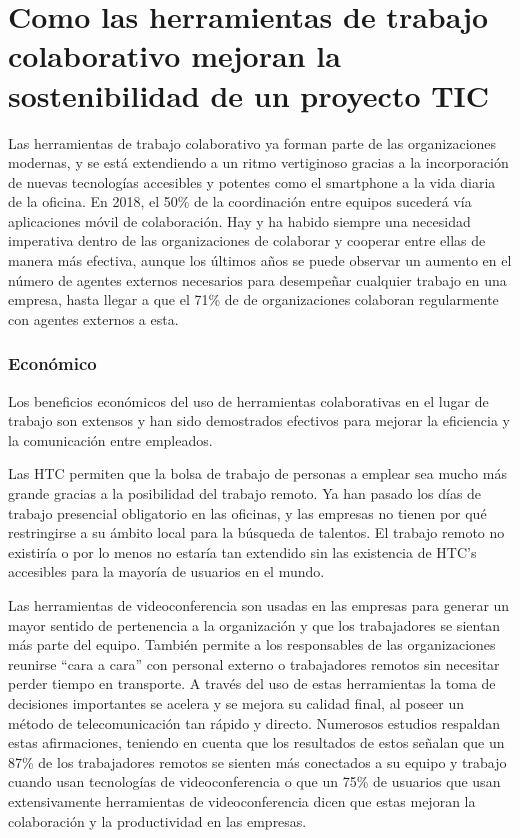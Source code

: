 \section{Como las herramientas de trabajo colaborativo mejoran la sostenibilidad de un proyecto TIC}

Las herramientas de trabajo colaborativo ya forman parte de las organizaciones modernas, y se está extendiendo a un ritmo vertiginoso gracias a la incorporación de nuevas tecnologías accesibles y potentes como el smartphone a la vida diaria de la oficina. En 2018, el 50\%\cite{adam} de la coordinación entre equipos sucederá vía aplicaciones móvil de colaboración. Hay y ha habido siempre una necesidad imperativa dentro de las organizaciones de colaborar y cooperar entre ellas de manera más efectiva, aunque los últimos años se puede observar un aumento en el número de agentes externos necesarios para desempeñar cualquier trabajo en una empresa, hasta llegar a que el 71\%\cite{ceb} de de organizaciones colaboran regularmente con agentes externos a esta.

\subsubsection{Económico}

Los beneficios económicos del uso de herramientas colaborativas en el lugar de trabajo son extensos y han sido demostrados efectivos para mejorar la eficiencia y la comunicación entre empleados.

Las HTC permiten que la bolsa de trabajo de personas a emplear sea mucho más grande gracias a la posibilidad del trabajo remoto. Ya han pasado los días de trabajo presencial obligatorio en las oficinas, y las empresas no tienen por qué restringirse a su ámbito local para la búsqueda de talentos. El trabajo remoto no existiría o por lo menos no estaría tan extendido sin las existencia de HTC’s accesibles para la mayoría de usuarios en el mundo.

Las herramientas de videoconferencia son usadas en las empresas para generar un mayor sentido de pertenencia a la organización y que los trabajadores se sientan más parte del equipo. También permite a los responsables de las organizaciones reunirse “cara a cara”   con personal externo o trabajadores remotos sin necesitar perder tiempo en transporte. A través del uso de estas herramientas la toma de decisiones importantes se acelera y se mejora su calidad final, al poseer un método de telecomunicación tan rápido y directo. Numerosos estudios respaldan estas afirmaciones, teniendo en cuenta que los resultados de estos señalan que un 87\%\cite{zeus} de los trabajadores remotos se sienten más conectados a su equipo y trabajo cuando usan tecnologías de videoconferencia o que un 75\%\cite{zeus} de usuarios que usan extensivamente herramientas de videoconferencia dicen que estas mejoran la colaboración y la productividad en las empresas.

